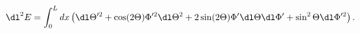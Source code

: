 \begin{equation*}
  \dl^2 E=\int_0^Ldx\left(\dl\Theta^{\prime2}
  +\cos(2\Theta)\Phi^{\prime2}\dl\Theta^2
  +2\sin(2\Theta)\Phi'\dl\Theta\dl\Phi'
  +\sin^2\Theta\dl\Phi^{\prime2}\right).
\end{equation*}

